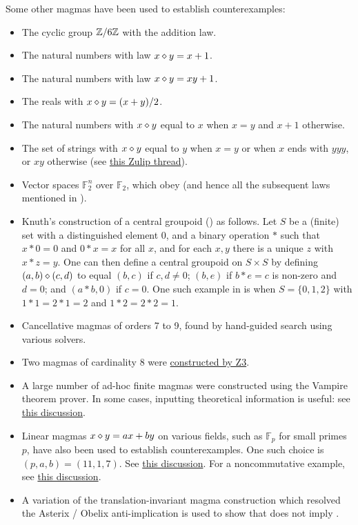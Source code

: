 Some other magmas have been used to establish counterexamples:
\begin{itemize}
  \item The cyclic group $\mathbb{Z}/6\mathbb{Z}$ with the addition law.
  \item The natural numbers with law $x \diamond y = x+1$.
  \item The natural numbers with law $x \diamond y = xy+1$.
  \item The reals with $x \diamond y = (x+y)/2$.
  \item The natural numbers with $x \diamond y$ equal to $x$ when $x=y$ and $x+1$ otherwise.
  \item The set of strings with $x \diamond y$ equal to $y$ when $x=y$ or when $x$ ends with $yyy$, or $xy$ otherwise (see \href{https://leanprover.zulipchat.com/#narrow/stream/458659-Equational/topic/3102.20does.20not.20imply.203176/near/474656031}{this Zulip thread}).
  \item Vector spaces ${\mathbb F}_2^n$ over ${\mathbb F}_2$, which obey  (and hence all the subsequent laws mentioned in ).
  \item Knuth's construction \cite{knuth} of a central groupoid () as follows.  Let $S$ be a (finite) set with a distinguished element $0$, and a binary operation $*$ such that $x*0=0$ and $0*x=x$   for all $x$, and for each $x,y$ there is a unique $z$ with $x*z=y$.  One can then define a central groupoid on $S \times S$ by defining $(a,b) \diamond (c,d)$ to equal $(b,c)$ if $c,d \neq 0$; $(b,e)$ if $b*e=c$ is non-zero and $d=0$; and $(a*b,0)$ if $c=0$.  One such example in \cite{knuth} is when $S = \{0,1,2\}$ with $1*1=2*1=2$ and $1*2=2*2=1$.
  \item Cancellative magmas of orders 7 to 9, found by hand-guided search using various solvers.
  \item Two magmas of cardinality $8$ were \href{https://leanprover.zulipchat.com/#narrow/stream/458659-Equational/topic/using.20z3/near/474918100}{constructed by Z3}.
  \item A large number of ad-hoc finite magmas were constructed using the Vampire theorem prover.  In some cases, inputting theoretical information is useful: see \href{https://leanprover.zulipchat.com/#narrow/channel/458659-Equational/topic/Outstanding.20equations.2C.20v1/near/478066872}{this discussion}.
  \item Linear magmas $x\diamond y = ax+by$ on various fields, such as ${\mathbb F}_p$ for small primes $p$, have also been used to establish counterexamples.  One such choice is $(p,a,b) = (11,1,7)$. See \href{https://leanprover.zulipchat.com/#narrow/stream/458659-Equational/topic/An.20old.20new.20idea}{this discussion}.  For a noncommutative example, see \href{https://leanprover.zulipchat.com/#narrow/channel/458659-Equational/topic/Outstanding.20equations.2C.20v1/near/477928995.2E01}{this discussion}.
  \item A variation of the translation-invariant magma construction which resolved the Asterix / Obelix anti-implication is used to show that  does not imply .
\end{itemize}
